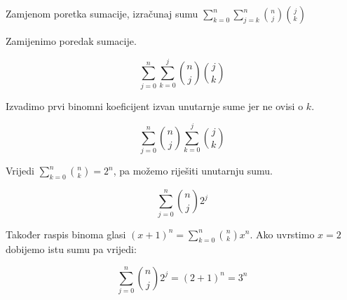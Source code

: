 \documentclass[exam.tex]{subfiles}
\begin{document}
	\begin{task}
		Zamjenom poretka sumacije, izračunaj sumu \( \displaystyle \sum\limits^n_{k=0} \sum\limits^n_{j=k} \binom{n}{j} \binom{j}{k} \) \\[1em]
	\end{task}
	
	Zamijenimo poredak sumacije.
	
	\[ \sum\limits^n_{j=0} \sum\limits^j_{k=0} \binom{n}{j} \binom{j}{k} \]
	
	Izvadimo prvi binomni koeficijent izvan unutarnje sume jer ne ovisi o \( k \).
	
	\[ \sum\limits^n_{j=0} \binom{n}{j} \sum\limits^j_{k=0} \binom{j}{k} \]
	
	Vrijedi \( \displaystyle \sum\limits^n_{k=0} \binom{n}{k} = 2^n \), pa možemo riješiti unutarnju sumu.
	
	\[ \sum\limits^n_{j=0} \binom{n}{j} 2^j \]
	
	Također raspis binoma glasi \( \displaystyle (x + 1)^n = \sum\limits^n_{k=0} \binom{n}{k} x^n \). Ako uvrstimo \( x = 2 \) dobijemo istu sumu pa vrijedi:
	
	\[ \sum\limits^n_{j=0} \binom{n}{j} 2^j = (2 + 1)^n = 3^n \]
\end{document}
